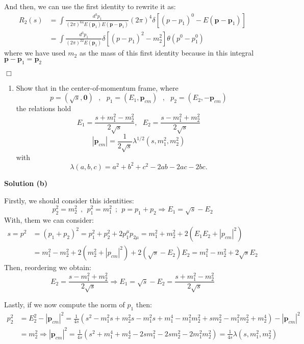 \documentclass[12pt]{article}
\newcommand{\qedwhite}{\hfill \ensuremath{\Box}}
\begin{document}
And then, we can use the first identity to rewrite it as:
\[
    \begin{aligned}
        R_2(s) &= \int  \frac{d^3p_1}{(2\pi)^64E(\mathbf{p}_1)E(\mathbf{p}-\mathbf{p}_1)} (2\pi)^4 \delta[(p-p_1)^0 - E(\mathbf{p}-\mathbf{p}_1)] \\
               &= \int  \frac{d^3p_1}{(2\pi)^22E(\mathbf{p}_1)} \delta[(p-p_1)^2 - m_2^2]\theta(p^0-p_1^0)
    \end{aligned}
\]
where we have used $m_2$ as the mass of this first identity because in this integral $\mathbf{p}-\mathbf{p}_1 = \mathbf{p}_2$

\qedwhite

\color{black}

\begin{enumerate}[label=(\alph*), start = 2]
    \item Show that in the center-of-momentum frame, where
        \[
            p = \left(\sqrt{s},\mathbf{0}\right) ~~~ , ~~~ p_1 = \left(E_1,\mathbf{p}_{cm}\right) ~~~ , ~~~ p_2 = (E_2, -\mathbf{p}_{cm})
        \]
        the relations hold
        \[
            E_1 = \frac{s + m_1^2 - m_2^2}{2\sqrt{s}}, ~~~ E_2 = \frac{s - m_1^2 + m_2^2}{2\sqrt{s}}
        \]
        \[
            \left|\mathbf{p}_{cm}\right|=\frac{1}{2\sqrt{s}}\lambda^{1/2}(s,m_1^2,m_2^2)
        \]
        with
        \[
            \lambda(a,b,c) = a^2 + b^2 + c^2 - 2ab - 2ac - 2bc.
        \]
\end{enumerate}

\color{blue}

\textbf{Solution (b)}

Firstly, we should consider this identities:
\[
    p_2^2 = m_2^2 ~~,~~ p_1^2 = m_1^2 ~~;~~ p = p_1 + p_2 \Longrightarrow E_1= \sqrt{s} - E_2
\]
With, them we can consider:
\[
    \begin{aligned}
        s = p^2 &= (p_1+p_2)^2 = p_1^2 + p_2^2 + 2p_1^\mu p_{2\mu}= m_1^2 + m_2^2 + 2(E_1E_2+|p_{cm}|^2) \\
                &= m_1^2 - m_2^2 + 2(m_2^2 + |p_{cm}|^2) + 2(\sqrt{s} - E_2)E_2 = m_1^2 - m_2^2 + 2\sqrt{s}E_2
    \end{aligned}
\]
Then, reordering we obtain:
\[
    E_2 = \frac{s-m_1^2+m_2^2}{2\sqrt{s}} \Longrightarrow E_1 = \sqrt{s} - E_2 = \frac{s+m_1^2-m_2^2}{2\sqrt{s}}
\]

Lastly, if we now compute the norm of $p_1$ then:
\[
    \begin{aligned}
        p_2^2 &= E_2^2 - |\mathbf{p}_{cm}|^2 = \frac{1}{4s}\left(s^2 - m_1^2s + m_2^2s - m_1^2s + m_1^4 - m_1^2m_2^2 + sm_2^2 - m_1^2m_2^2 + m_2^4\right) - |\mathbf{p}_{cm}|^2 \\
              &= m_2^2 \Longrightarrow |\mathbf{p}_{cm}|^2 = \frac{1}{4s}\left(s^2 + m_1^4 + m_2^4 - 2sm_1^2 - 2sm_2^2 - 2m_1^2m_2^2\right) = \frac{1}{4s}\lambda(s,m_1^2,m_2^2)
    \end{aligned}
\]
\end{document}
